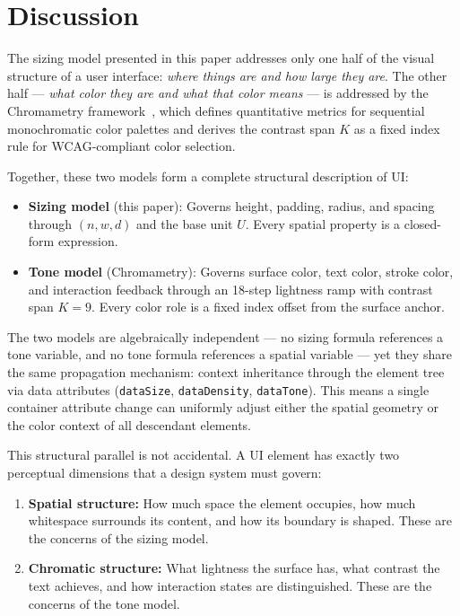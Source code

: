 \section{Discussion}
\label{sec:discussion}

The sizing model presented in this paper addresses only one half of the visual structure of a user interface: \emph{where things are and how large they are}. The other half --- \emph{what color they are and what that color means} --- is addressed by the Chromametry framework~\cite{chromametry}, which defines quantitative metrics for sequential monochromatic color palettes and derives the contrast span $K$ as a fixed index rule for WCAG-compliant color selection.

Together, these two models form a complete structural description of UI:

\begin{itemize}
  \item \textbf{Sizing model} (this paper): Governs height, padding, radius, and spacing through $(n, w, d)$ and the base unit $U$. Every spatial property is a closed-form expression.

  \item \textbf{Tone model} (Chromametry): Governs surface color, text color, stroke color, and interaction feedback through an 18-step lightness ramp with contrast span $K = 9$. Every color role is a fixed index offset from the surface anchor.
\end{itemize}

The two models are algebraically independent --- no sizing formula references a tone variable, and no tone formula references a spatial variable --- yet they share the same propagation mechanism: context inheritance through the element tree via data attributes (\texttt{dataSize}, \texttt{dataDensity}, \texttt{dataTone}). This means a single container attribute change can uniformly adjust either the spatial geometry or the color context of all descendant elements.

This structural parallel is not accidental. A UI element has exactly two perceptual dimensions that a design system must govern:

\begin{enumerate}
  \item \textbf{Spatial structure:} How much space the element occupies, how much whitespace surrounds its content, and how its boundary is shaped. These are the concerns of the sizing model.

  \item \textbf{Chromatic structure:} What lightness the surface has, what contrast the text achieves, and how interaction states are distinguished. These are the concerns of the tone model.
\end{enumerate}

